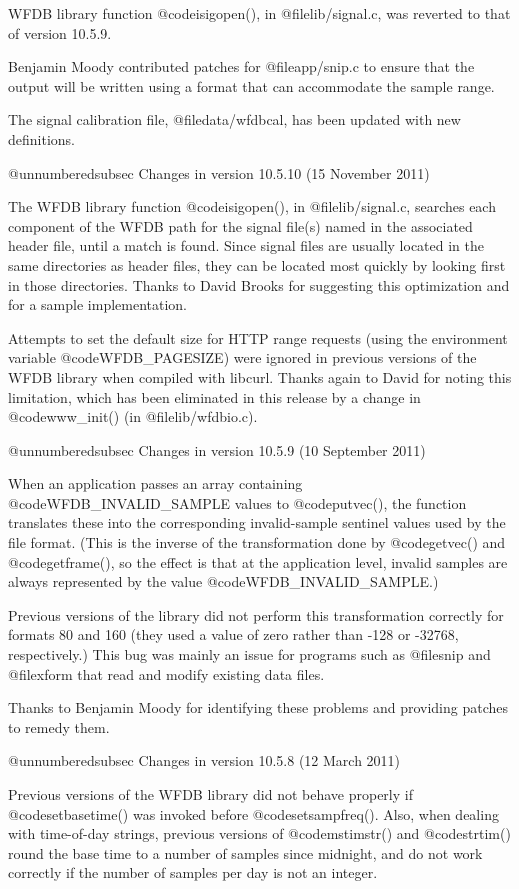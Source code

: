 {{{{{{{{WFDB library function @code{isigopen()}, in @file{lib/signal.c}, was reverted
to that of version 10.5.9.

Benjamin Moody contributed patches for @file{app/snip.c} to ensure that the
output will be written using a format that can accommodate the sample
range.

The signal calibration file, @file{data/wfdbcal}, has been updated with
new definitions.

@unnumberedsubsec Changes in version 10.5.10 (15 November 2011)

The WFDB library function @code{isigopen()}, in @file{lib/signal.c}, searches
each component of the WFDB path for the signal file(s) named in the associated
header file, until a match is found.  Since signal files are usually located in
the same directories as header files, they can be located most quickly by
looking first in those directories.  Thanks to David Brooks for suggesting this
optimization and for a sample implementation.

Attempts to set the default size for HTTP range requests (using the environment
variable @code{WFDB_PAGESIZE}) were ignored in previous versions of the WFDB
library when compiled with libcurl.  Thanks again to David for noting this
limitation, which has been eliminated in this release by a change in
@code{www_init()} (in @file{lib/wfdbio.c}).

@unnumberedsubsec Changes in version 10.5.9 (10 September 2011)

When an application passes an array containing @code{WFDB_INVALID_SAMPLE}
values to @code{putvec()}, the function translates these into the corresponding
invalid-sample sentinel values used by the file format.  (This is the inverse
of the transformation done by @code{getvec()} and @code{getframe()}, so the
effect is that at the application level, invalid samples are always represented
by the value @code{WFDB_INVALID_SAMPLE}.)

Previous versions of the library did not perform this transformation correctly
for formats 80 and 160 (they used a value of zero rather than -128 or -32768,
respectively.)  This bug was mainly an issue for programs such as @file{snip}
and @file{xform} that read and modify existing data files.

Thanks to Benjamin Moody for identifying these problems and providing patches
to remedy them.

@unnumberedsubsec Changes in version 10.5.8 (12 March 2011)

Previous versions of the WFDB library did not behave properly if
@code{setbasetime()} was invoked before @code{setsampfreq()}.  Also, when
dealing with time-of-day strings, previous versions of @code{mstimstr()} and
@code{strtim()} round the base time to a number of samples since midnight, and
do not work correctly if the number of samples per day is not an integer.

}}}}}}}}

